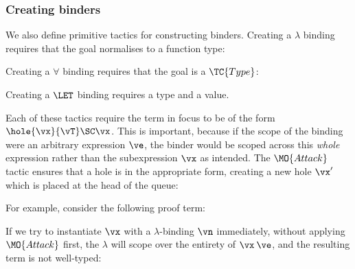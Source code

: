 \subsubsection{Creating binders}

We also define primitive tactics for constructing binders. Creating a $\lambda$
binding requires that the goal normalises to a function type:


\noindent
Creating a $\forall$ binding requires that the goal is a $\TC{Type}$:


\noindent
Creating a $\LET$ binding requires a type and a value.


Each of these tactics require the term in focus to be of the form $\hole{\vx}{\vT}\SC\vx$.
This is important, because if the scope of the binding were an arbitrary expression $\ve$,
the binder would be scoped across this \emph{whole} expression rather than the subexpression
$\vx$ as intended.
The $\MO{Attack}$ tactic ensures that a hole
is in the appropriate form, creating a new hole $\vx'$ which is placed at the
head of the queue:


\noindent
For example, consider the following proof term:

\DM{
\hole{\vx}{\va\to\vb}\SC\vx\:\ve
}

\noindent
If we try to instantiate $\vx$ with a $\lambda$-binding $\vn$ immediately,
without applying $\MO{Attack}$ first, the $\lambda$ will scope over the
entirety of $\vx\:\ve$, and the resulting term is not well-typed:


